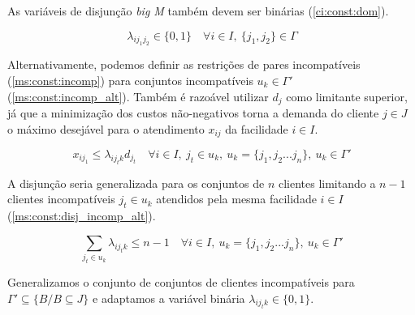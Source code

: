 \documentclass[]{article}
\begin{document}
    As variáveis de disjunção \textit{big M} também devem ser binárias (\ref{ci:const:dom}).

    \begin{equation}
		\label{ci:const:dom}		
		\lambda_{ij_1j_2} \in \{0, 1\}
		\quad
		\forall i \in I,  		
		\ \{ j_1, j_2 \} \in \Gamma
	\end{equation}

	Alternativamente, podemos definir as restrições de pares incompatíveis (\ref{ms:const:incomp}) para conjuntos incompatíveis $u_k \in \Gamma'$ (\ref{ms:const:incomp_alt}). 
	Também é razoável utilizar $d_j$ como limitante superior, 
	já que a minimização dos custos não-negativos torna a demanda do cliente $j \in J$ o máximo desejável para o atendimento $x_{ij}$ da facilidade $i \in I$.   
	
	\begin{equation}
		\label{ms:const:incomp_alt}		
		x_{ij_1} \le \lambda_{ij_tk} d_{j_t} 
		\quad
		\forall i \in I, 
		\ j_t \in u_k,
		\ u_k = \{ j_1, j_2 ... j_n \},
		\ u_k \in \Gamma'  
	\end{equation}
	
	A disjunção seria generalizada para os conjuntos de $n$ clientes limitando a $n-1$ clientes incompatíveis $j_t \in u_k$ atendidos pela mesma facilidade $i \in I$ (\ref{ms:const:disj_incomp_alt}). 
	
	\begin{equation}
		\label{ms:const:disj_incomp_alt}
		\sum_{j_t \in u_k} \lambda_{ij_tk} \le n - 1 
		\quad
		\forall i \in I, 
		\ u_k = \{ j_1, j_2 ... j_n \},
		\ u_k \in \Gamma'  
	\end{equation}

	Generalizamos o conjunto de conjuntos de clientes incompatíveis para $\Gamma' \subseteq \{ B / B \subseteq J \}$ e adaptamos a variável binária $\lambda_{ij_tk} \in \{0,1\}$. 
	 



\end{document}
